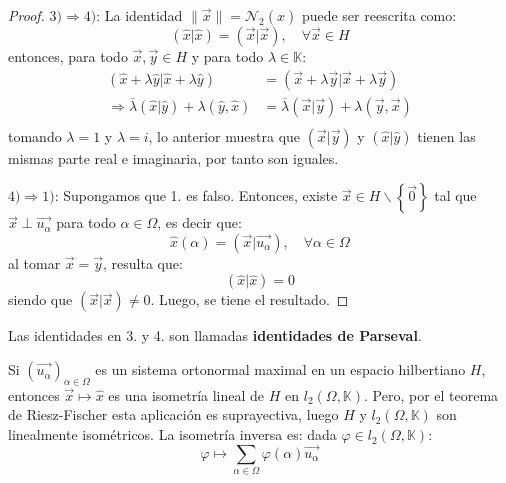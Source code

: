 \documentclass[12pt]{report}
\theoremstyle{largebreak}
\newcommand\norm[1]{\ensuremath{\|#1\|}}
\newcommand\pint[2]{\ensuremath{\left(#1\big| #2\right)}}
\newcommand\conj[1]{\ensuremath{\overline{#1}}}
\newcommand{\N}[2]{\ensuremath{\mathcal{N}_{#1}\left(#2\right)}}
\begin{document}
\begin{proof}
        $3)\Rightarrow 4)$: La identidad $\norm{\vec{x}}=\N{2}{\hat{x}}$ puede ser reescrita como:
        \begin{equation*}
            \pint{\hat{x}}{\hat{x}}=\pint{\vec{x}}{\vec{x}},\quad\forall\vec{x}\in H
        \end{equation*}
        entonces, para todo $\vec{x},\vec{y}\in H$ y para todo $\lambda\in\mathbb{K}$:
        \begin{equation*}
            \begin{split}
                \pint{\hat{x}+\lambda\hat{y}}{\hat{x}+\lambda\hat{y}}&=\pint{\vec{x}+\lambda\vec{y}}{\vec{x}+\lambda\vec{y}}\\
                \Rightarrow \conj{\lambda}\pint{\hat{x}}{\hat{y}}+\lambda(\hat{y},\hat{x})&=\conj{\lambda}\pint{\vec{x}}{\vec{y}}+\lambda(\vec{y},\vec{x})\\
            \end{split}
        \end{equation*}
        tomando $\lambda=1$ y $\lambda=i$, lo anterior muestra que $\pint{\vec{x}}{\vec{y}}$ y $\pint{\hat{x}}{\hat{y}}$ tienen las mismas parte real e imaginaria, por tanto son iguales.

        $4)\Rightarrow 1)$: Supongamos que 1. es falso. Entonces, existe $\vec{x}\in H\backslash\left\{\vec{0} \right\}$ tal que $\vec{x}\perp\vec{u_\alpha}$ para todo $\alpha\in\Omega$, es decir que:
        \begin{equation*}
            \hat{x}(\alpha)=\pint{\vec{x}}{\vec{u_\alpha}},\quad\forall\alpha\in\Omega
        \end{equation*}
        al tomar $\vec{x}=\vec{y}$, resulta que:
        \begin{equation*}
            \pint{\hat{x}}{\hat{x}}=0
        \end{equation*}
        siendo que $\pint{\vec{x}}{\vec{x}}\neq0$. Luego, se tiene el resultado.
    \end{proof}

    \begin{obs}
        Las identidades en 3. y 4. son llamadas \textbf{identidades de Parseval}.
    \end{obs}

    \begin{obs}
        Si $\left(\vec{u_\alpha} \right)_{\alpha\in\Omega}$ es un sistema ortonormal maximal en un espacio hilbertiano $H$, entonces $\vec{x}\mapsto\hat{x}$ es una isometría lineal de $H$ en $l_2(\Omega,\mathbb{K})$. Pero, por el teorema de Riesz-Fischer esta aplicación es suprayectiva, luego $H$ y $l_2(\Omega,\mathbb{K})$ son linealmente isométricos. La isometría inversa es: dada $\varphi\in l_2(\Omega,\mathbb{K})$:
        \begin{equation*}
            \varphi\mapsto\sum_{\alpha\in\Omega}\varphi(\alpha)\vec{u_\alpha}
        \end{equation*}
    \end{obs}
\end{document}
